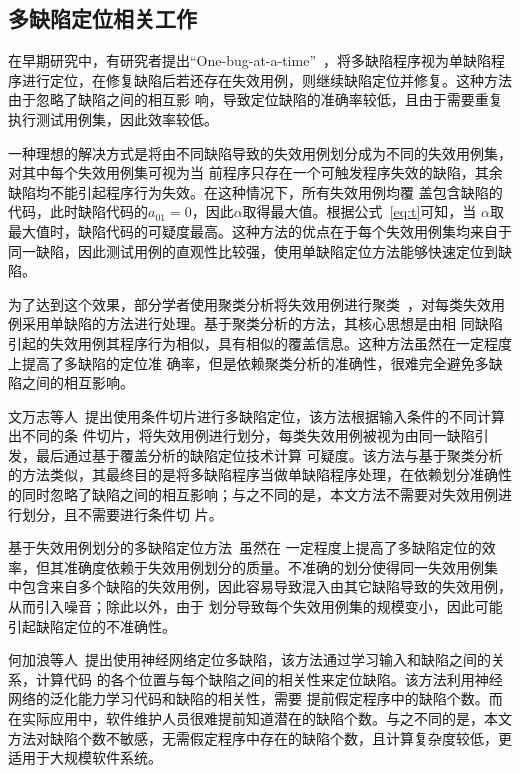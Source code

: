 \subsection{多缺陷定位相关工作}
在早期研究中，有研究者提出``One-bug-at-a-time''~\cite{klahr1988cognitive}，将多缺陷程序视为单缺陷程
序进行定位，在修复缺陷后若还存在失效用例，则继续缺陷定位并修复。这种方法由于忽略了缺陷之间的相互影
响，导致定位缺陷的准确率较低，且由于需要重复执行测试用例集，因此效率较低。

一种理想的解决方式是将由不同缺陷导致的失效用例划分成为不同的失效用例集，对其中每个失效用例集可视为当
前程序只存在一个可触发程序失效的缺陷，其余缺陷均不能引起程序行为失效。在这种情况下，所有失效用例均覆
盖包含缺陷的代码，此时缺陷代码的$a_{01}=0$，因此$\alpha$取得最大值。根据公式~\eqref{eq:t}可知，当
$\alpha$取最大值时，缺陷代码的可疑度最高。这种方法的优点在于每个失效用例集均来自于同一缺陷，因此测试用例的直观性比较强，使用单缺陷定位方法能够快速定位到缺陷。

为了达到这个效果，部分学者使用聚类分析将失效用例进行聚类~\cite{jones2007debugging,
zheng2006statistical}，对每类失效用例采用单缺陷的方法进行处理。基于聚类分析的方法，其核心思想是由相
同缺陷引起的失效用例其程序行为相似，具有相似的覆盖信息。这种方法虽然在一定程度上提高了多缺陷的定位准
确率，但是依赖聚类分析的准确性，很难完全避免多缺陷之间的相互影响。

文万志等人~\cite{conslice2013}提出使用条件切片进行多缺陷定位，该方法根据输入条件的不同计算出不同的条
件切片，将失效用例进行划分，每类失效用例被视为由同一缺陷引发，最后通过基于覆盖分析的缺陷定位技术计算
可疑度。该方法与基于聚类分析的方法类似，其最终目的是将多缺陷程序当做单缺陷程序处理，在依赖划分准确性
的同时忽略了缺陷之间的相互影响；与之不同的是，本文方法不需要对失效用例进行划分，且不需要进行条件切
片。

基于失效用例划分的多缺陷定位方法~\cite{zheng2006statistical, jones2007debugging, conslice2013}虽然在
一定程度上提高了多缺陷定位的效率，但其准确度依赖于失效用例划分的质量。不准确的划分使得同一失效用例集
中包含来自多个缺陷的失效用例，因此容易导致混入由其它缺陷导致的失效用例，从而引入噪音；除此以外，由于
划分导致每个失效用例集的规模变小，因此可能引起缺陷定位的不准确性。

何加浪等人~\cite{neural2013}提出使用神经网络定位多缺陷，该方法通过学习输入和缺陷之间的关系，计算代码
的各个位置与每个缺陷之间的相关性来定位缺陷。该方法利用神经网络的泛化能力学习代码和缺陷的相关性，需要
提前假定程序中的缺陷个数。而在实际应用中，软件维护人员很难提前知道潜在的缺陷个数。与之不同的是，本文
方法对缺陷个数不敏感，无需假定程序中存在的缺陷个数，且计算复杂度较低，更适用于大规模软件系统。

